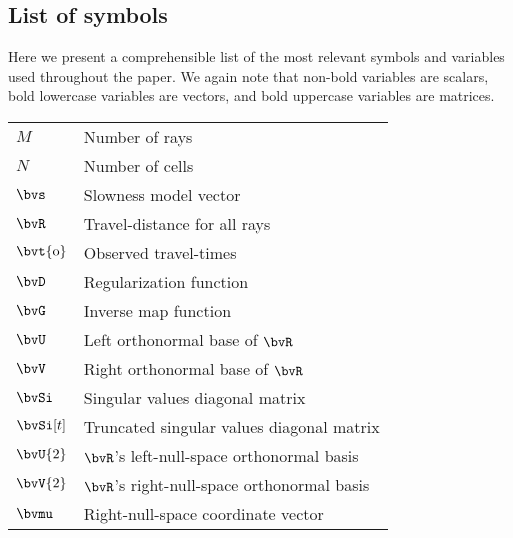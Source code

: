 \subsection{List of symbols}
\label{app:appA:list_of_symbols}
Here we present a comprehensible list of the most relevant symbols and variables used throughout the paper. We again note that non-bold variables are scalars, bold lowercase variables are vectors, and bold uppercase variables are matrices.

\begin{tabular}{l l}
	$M$ & Number of rays \\
	$N$ & Number of cells \\
	$\bvs$ & Slowness model vector \\
	$\bvR$ & Travel-distance for all rays \\
	$\bvt{\obs}$ & Observed travel-times \\
	$\bvD$ & Regularization function \\
	$\bvG$ & Inverse map function \\
	$\bvU$ & Left orthonormal base of $\bvR$ \\
	$\bvV$ & Right orthonormal base of $\bvR$ \\
	$\bvSi$ & Singular values diagonal matrix \\
	$\bvSi[t]$ & Truncated singular values diagonal matrix \\
	$\bvU{2}$ & $\bvR$'s left-null-space orthonormal basis \\
	$\bvV{2}$ & $\bvR$'s right-null-space orthonormal basis \\
	$\bvmu$ & Right-null-space coordinate vector
\end{tabular}